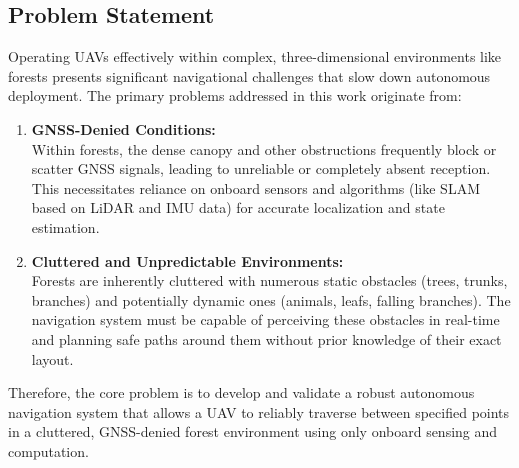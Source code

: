         \subsection{Problem Statement}
            Operating \ac{UAV}s effectively within complex, three-dimensional environments like forests presents significant navigational challenges that slow down autonomous deployment. 
            The primary problems addressed in this work originate from:
            \begin{enumerate}
                \item \textbf{\ac{GNSS}-Denied Conditions: } \\
                Within forests, the dense canopy and other obstructions frequently block or scatter \ac{GNSS} signals, leading to unreliable or completely absent reception.
                This necessitates reliance on onboard sensors and algorithms (like \ac{SLAM} based on \ac{LiDAR} and \ac{IMU} data) for accurate localization and state estimation.
                \item \textbf{Cluttered and Unpredictable Environments: } \\
                Forests are inherently cluttered with numerous static obstacles (trees, trunks, branches) and potentially dynamic ones (animals, leafs, falling branches). 
                The navigation system must be capable of perceiving these obstacles in real-time and planning safe paths around them without prior knowledge of their exact layout.
            \end{enumerate}
            Therefore, the core problem is to develop and validate a robust autonomous navigation system that allows a \ac{UAV} to reliably traverse between specified points in a cluttered, \ac{GNSS}-denied forest environment using only onboard sensing and computation.

